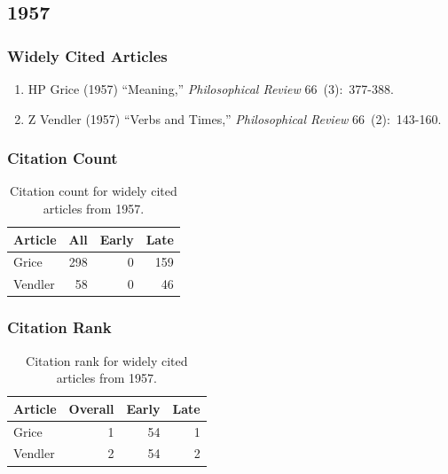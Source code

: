 \documentclass[
  10pt,
  letterpaper,
  DIV=11,
  numbers=noendperiod,
  twoside]{scrartcl}
\providecommand{\tightlist}{%
  \setlength{\itemsep}{0pt}\setlength{\parskip}{0pt}}\usepackage{longtable,booktabs,array}
\begin{document}
\newpage

\subsection{1957}\label{sec-s1957}

\subsubsection*{Widely Cited Articles}\label{widely-cited-articles-1}

\begin{enumerate}
\def\labelenumi{\arabic{enumi}.}
\tightlist
\item
  HP Grice (1957) ``Meaning,'' \emph{Philosophical Review}
  66~(3):~377-388.
\item
  Z Vendler (1957) ``Verbs and Times,'' \emph{Philosophical Review}
  66~(2):~143-160.
\end{enumerate}

\subsubsection*{Citation Count}\label{sec-count-1957}

\begin{longtable}[]{@{}lrrr@{}}

\caption{\label{tbl-citation-count-1957}Citation count for widely cited
articles from 1957.}

\tabularnewline

\toprule\noalign{}
Article & All & Early & Late \\
\midrule\noalign{}
\endhead
\bottomrule\noalign{}
\endlastfoot
Grice & 298 & 0 & 159 \\
Vendler & 58 & 0 & 46 \\

\end{longtable}

\subsubsection*{Citation Rank}\label{sec-rank-1957}

\begin{longtable}[]{@{}lrrr@{}}

\caption{\label{tbl-citation-rank-1957}Citation rank for widely cited
articles from 1957.}

\tabularnewline

\toprule\noalign{}
Article & Overall & Early & Late \\
\midrule\noalign{}
\endhead
\bottomrule\noalign{}
\endlastfoot
Grice & 1 & 54 & 1 \\
Vendler & 2 & 54 & 2 \\

\end{longtable}
\end{document}
